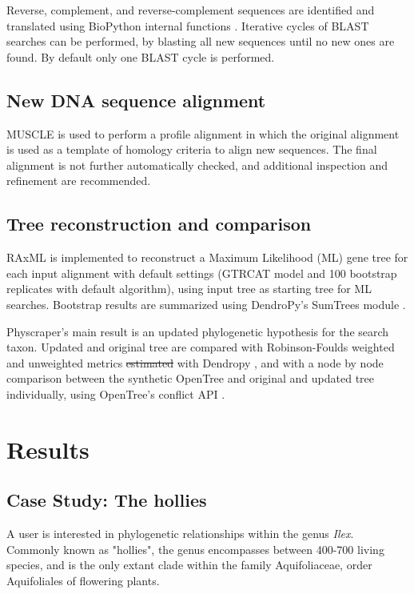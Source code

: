 \documentclass{bmcart}
\providecommand{\DIFaddtex}[1]{{\protect\color{blue}\uwave{#1}}} %
\providecommand{\DIFdeltex}[1]{{\protect\color{red}\sout{#1}}}                      %
\providecommand{\DIFaddbegin}{} %
\providecommand{\DIFaddend}{} %
\providecommand{\DIFdelbegin}{} %
\providecommand{\DIFdelend}{} %
\providecommand{\DIFadd}[1]{\texorpdfstring{\DIFaddtex{#1}}{#1}} %
\providecommand{\DIFdel}[1]{\texorpdfstring{\DIFdeltex{#1}}{}} %
\begin{document}
Reverse, complement, and reverse-complement sequences are identified and translated
using BioPython internal functions \cite{cock2009biopython}.
Iterative cycles of BLAST searches can be performed, by blasting all new sequences
until no new ones are found. By default only one BLAST cycle is performed.

\subsection*{New DNA sequence alignment}

MUSCLE \cite{edgar2004muscle} is used to perform a profile alignment in which the
original alignment is used as a template of homology criteria to align new sequences.
The final alignment is not further automatically checked, and additional inspection
and refinement are recommended.

\subsection*{Tree reconstruction and comparison}

RAxML \cite{stamatakis2014raxml} is implemented to reconstruct a Maximum Likelihood
(ML) gene tree for each input alignment with default settings (GTRCAT model and
100 bootstrap replicates with default algorithm), using input tree as starting
tree for ML searches.
Bootstrap results are summarized using DendroPy's SumTrees module
\cite{sukumaran2010dendropy}.

Physcraper's main result is an updated phylogenetic hypothesis for the search taxon.
Updated and original tree are compared with Robinson-Foulds weighted and unweighted
metrics \DIFdelbegin \DIFdel{estimated }\DIFdelend \DIFaddbegin \DIFadd{calculated }\DIFaddend with Dendropy \cite{sukumaran2010dendropy}, and with a node by node
comparison between the synthetic OpenTree and original and updated tree individually,
using OpenTree's conflict API \cite{redelings2017supertree}.


\section*{Results}
\subsection*{Case Study: The hollies}

A user is interested in phylogenetic relationships within the genus \textit{Ilex}. Commonly
known as "hollies", the genus encompasses between 400-700 living species, and is
the only extant clade within the family Aquifoliaceae, order Aquifoliales of flowering
plants.
\end{document}
